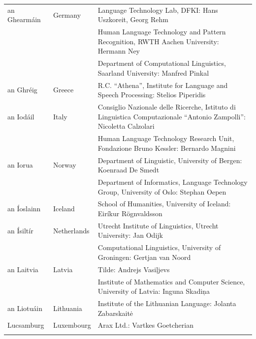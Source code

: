 \begin{longtable}{@{}llp{113mm}@{}}
  an Ghearmáin  & \textcolor{grey1}{Germany} & Language Technology Lab, DFKI: Hans Uszkoreit, Georg Rehm\\ \addlinespace
  & & Human Language Technology and Pattern Recognition, RWTH Aachen University: Hermann Ney \\ \addlinespace
  & & Department of Computational Linguistics, Saarland University: Manfred Pinkal\\ \addlinespace
   
  an Ghréig & \textcolor{grey1}{Greece} & R.C. “Athena”, Institute for Language and Speech Processing: Stelios Piperidis\\ \addlinespace
  
  an Iodáil & \textcolor{grey1}{Italy} & Consiglio Nazionale delle Ricerche, Istituto di Linguistica Computazionale “Antonio Zampolli”: Nicoletta Calzolari\\ \addlinespace
  & & Human Language Technology Research Unit, Fondazione Bruno Kessler: Bernardo Magnini\\ \addlinespace
 
  an Iorua & \textcolor{grey1}{Norway} & Department of Linguistic, University of Bergen: Koenraad De Smedt\\ \addlinespace 
  & & Department of Informatics, Language Technology Group, University of Oslo: Stephan Oepen \\ \addlinespace
  
  an Íoslainn & \textcolor{grey1}{Iceland} & School of Humanities, University of Iceland: Eiríkur Rögnvaldsson\\ \addlinespace
  
  an Ísiltír & \textcolor{grey1}{Netherlands} & Utrecht Institute of Linguistics, Utrecht University: Jan Odijk\\ \addlinespace 
  & & Computational Linguistics, University of Groningen: Gertjan van Noord\\ \addlinespace
   
  an Laitvia & \textcolor{grey1}{Latvia} & Tilde: Andrejs Vasiļjevs\\ \addlinespace 
  & & Institute of Mathematics and Computer Science, University of Latvia: Inguna Skadiņa\\ \addlinespace
  
  an Liotuáin & \textcolor{grey1}{Lithuania} & Institute of the Lithuanian Language: Jolanta Zabarskaitė\\ \addlinespace
  
  Lucsamburg & \textcolor{grey1}{Luxembourg} & Arax Ltd.: Vartkes Goetcherian\\ \addlinespace
  

\end{longtable}
